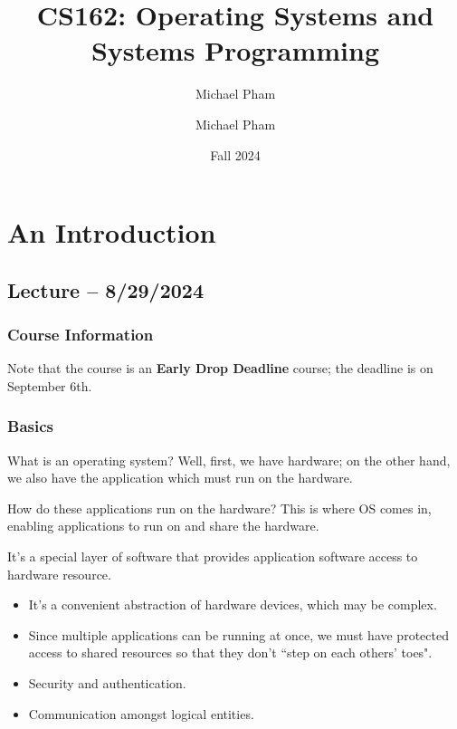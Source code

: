 \documentclass[openany]{book}
\title{#1}
\author{Michael Pham}
\date{#2}
\renewcommand{\mytitle}[2]{%
	\title{#1}
	\author{Michael Pham}
	\date{#2}
	\maketitle
	\newpage
	\mytoc
	\newpage
}
\begin{document}
\mytitle{CS162: Operating Systems and Systems Programming}{Fall 2024}

\chapter{An Introduction}
\section{Lecture -- 8/29/2024}
\subsection{Course Information}
\begin{warn}
	Note that the course is an \textbf{Early Drop Deadline} course; the deadline is on September 6th.
\end{warn}

\subsection{Basics}
What is an operating system? Well, first, we have hardware; on the other hand, we also have the application which must run on the hardware.

How do these applications run on the hardware? This is where OS comes in, enabling applications to run on and share the hardware.

\begin{defn}
	It's a special layer of software that provides application software access to hardware resource.
	\begin{itemize}
		\item It's a convenient abstraction of hardware devices, which may be complex.
		\item Since multiple applications can be running at once, we must have protected access to shared resources so that they don't ``step on each others' toes".
		\item Security and authentication.
		\item Communication amongst logical entities.
	\end{itemize}
\end{defn}
\end{document}
